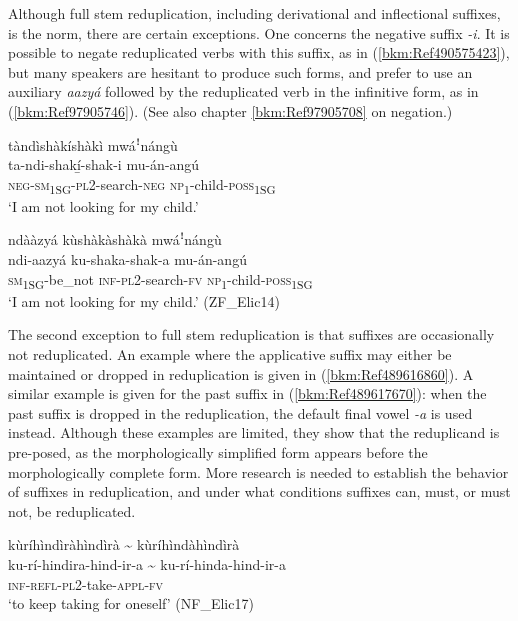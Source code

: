 Although full stem reduplication, including derivational and inflectional suffixes, is the norm, there are certain exceptions. One concerns the negative suffix \textit{-i}. It is possible to negate reduplicated verbs with this suffix, as in (\ref{bkm:Ref490575423}), but many speakers are hesitant to produce such forms, and prefer to use an auxiliary \textit{aazyá} followed by the reduplicated verb in the infinitive form, as in (\ref{bkm:Ref97905746}). (See also chapter \ref{bkm:Ref97905708} on negation.)

\ea
\label{bkm:Ref490575423}
tàndìshàkíshàkì mwáꜝnángù\\
\gll ta-ndi-shakí̲-shak-i      mu-án-angú\\
\textsc{neg}-\textsc{sm}\textsubscript{1SG}-\textsc{pl}2-search-\textsc{neg}  \textsc{np}\textsubscript{1}-child-\textsc{poss}\textsubscript{1SG}\\
\glt ‘I am not looking for my child.’
\z

\ea
\label{bkm:Ref97905746}
ndààzyá kùshàkàshàkà mwáꜝnángù\\
\gll ndi-aazyá    ku-shaka-shak-a  mu-án-angú\\
\textsc{sm}\textsubscript{1SG}-be\_not    \textsc{inf}-\textsc{pl}2-search-\textsc{fv}  \textsc{np}\textsubscript{1}-child-\textsc{poss}\textsubscript{1SG}\\
\glt ‘I am not looking for my child.’ (ZF\_Elic14)
\z

The second exception to full stem reduplication is that suffixes are occasionally not reduplicated. An example where the applicative suffix may either be maintained or dropped in reduplication is given in (\ref{bkm:Ref489616860}). A similar example is given for the past suffix in (\ref{bkm:Ref489617670}): when the past suffix is dropped in the reduplication, the default final vowel \textit{-a} is used instead. Although these examples are limited, they show that the reduplicand is pre-posed, as the morphologically simplified form appears before the morphologically complete form. More research is needed to establish the behavior of suffixes in reduplication, and under what conditions suffixes can, must, or must not, be reduplicated.

\ea
\label{bkm:Ref489616860}
kùríhìndìràhìndìrà {\textasciitilde} kùríhìndàhìndìrà\\
\gll ku-rí-hindira-hind-ir-a {\textasciitilde} ku-rí-hinda-hind-ir-a\\
\textsc{inf}-\textsc{refl}-\textsc{pl}2-take-\textsc{appl}-\textsc{fv} \\
\glt ‘to keep taking for oneself’ (NF\_Elic17)
\z

